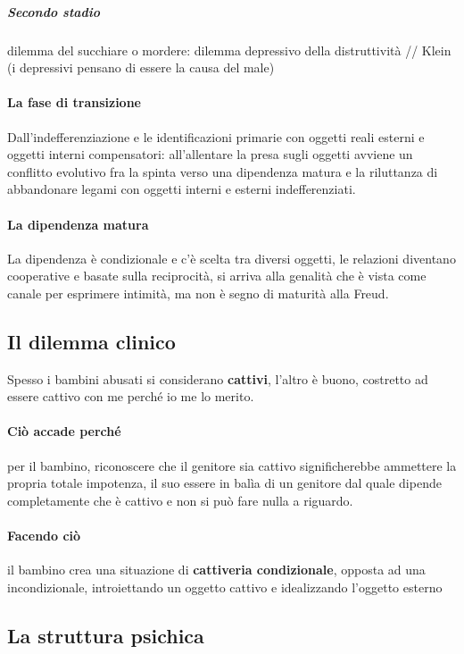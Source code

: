 \documentclass[12pt, a4paper]{article}
\begin{document}
\subparagraph{Secondo stadio} dilemma del succhiare o mordere: dilemma depressivo della distruttivit\`a // Klein (i depressivi pensano di essere la causa del male)

\paragraph{La fase di transizione} Dall'indefferenziazione e le identificazioni primarie con oggetti reali esterni e oggetti interni compensatori: all'allentare la presa sugli oggetti avviene un conflitto evolutivo fra la spinta verso una dipendenza matura e la riluttanza di abbandonare legami con oggetti interni e esterni indefferenziati.

\paragraph{La dipendenza matura} La dipendenza \`e condizionale e c'\`e scelta tra diversi oggetti, le relazioni diventano cooperative e basate sulla reciprocit\`a, si arriva alla genalit\`a che \`e vista come canale per esprimere intimit\`a, ma non \`e segno di maturit\`a alla Freud.

\subsection{Il dilemma clinico}

Spesso i bambini abusati si considerano \textbf{cattivi}, l'altro \`e buono, costretto ad essere cattivo con me perch\'e io me lo merito.

\paragraph{Ciò accade perch\'e} per il bambino, riconoscere che il genitore sia cattivo significherebbe ammettere la propria totale impotenza, il suo essere in bal\`ia di un genitore dal quale dipende completamente che \`e cattivo e non si può fare nulla a riguardo.

\paragraph{Facendo ciò} il bambino crea una situazione di \textbf{cattiveria condizionale}, opposta ad una incondizionale, introiettando un oggetto cattivo e idealizzando l'oggetto esterno

\subsection{La struttura psichica}
\end{document}
